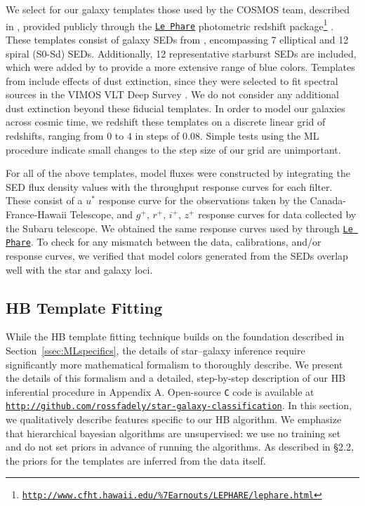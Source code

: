 \documentclass[12pt,preprint]{aastex}
\begin{document}
We select for our galaxy templates those used by the COSMOS team,
described in \citep{ilbert09}, provided publicly through the
\href{http://www.cfht.hawaii.edu/\%7Earnouts/LEPHARE/lephare.html}
{\texttt{Le Phare}} photometric redshift package\footnote{
\href{http://www.cfht.hawaii.edu/\%7Earnouts/LEPHARE/lephare.html}
{\tt http://www.cfht.hawaii.edu/\%7Earnouts/LEPHARE/lephare.html}}
\citep{arnouts99,ilbert06}.  These templates consist of galaxy SEDs
from \citet{polletta07}, encompassing 7 elliptical and 12 spiral
(S0-Sd) SEDs.  Additionally, 12 representative starburst SEDs are
included, which were added by \citet{ilbert09} to provide a more
extensive range of blue colors.  Templates from \citet{polletta07}
include effects of dust extinction, since they were selected to fit
spectral sources in the VIMOS VLT Deep Survey \citep{lefevre05}.  We
do not consider any additional dust extinction beyond these fiducial
templates.  In order to model our galaxies across cosmic time, we
redshift these templates on a discrete linear grid of redshifts,
ranging from 0 to 4 in steps of 0.08.  Simple tests using the ML
procedure indicate small changes to the step size of our grid are
unimportant. 

For all of the above templates, model fluxes were constructed by 
integrating the SED flux density values with the throughput response 
curves for each filter.  These consist of a $u^\ast$ response curve for 
the observations taken by the Canada-France-Hawaii Telescope, and 
$g^+$, $r^+$, $i^+$, $z^+$ response curves for data 
collected by the Subaru telescope.  We obtained the same response 
curves used by \citet{ilbert09} through 
\href{http://www.cfht.hawaii.edu/\%7Earnouts/LEPHARE/lephare.html}
{\texttt{Le Phare}}\footnotemark[5].  To check for any mismatch between 
the data, calibrations, and/or response curves, we verified that model 
colors generated from the SEDs overlap well with the star and galaxy loci.

\subsection{HB Template Fitting}
\label{ssec:HBspecifics}

While the HB template fitting technique builds on the foundation
described in Section~\ref{ssec:MLspecifics}, the details of
star--galaxy inference require significantly more mathematical
formalism to thoroughly describe.  We present the details of this
formalism and a detailed, step-by-step description of our HB
inferential procedure in Appendix A.  Open-source \texttt{C} code is
available at {\footnotesize
  \texttt{\url{http://github.com/rossfadely/star-galaxy-classification}}}.
In this section, we qualitatively describe features specific to our HB
algorithm.  We emphasize that hierarchical bayesian algorithms are
unsupervised: we use no training set and do not set priors in advance
of running the algorithms.  As described in \S2.2, the priors for the
templates are inferred from the data itself.
\end{document}
